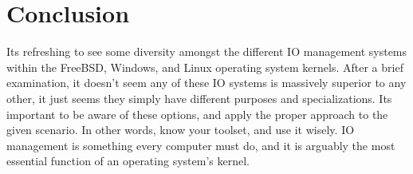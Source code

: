 \documentclass[letterpaper,10pt,draftclsnofoot,onecolumn]{IEEEtran}
\begin{document}
\section{Conclusion}
\noindent Its refreshing to see some diversity amongst the different IO management systems within the FreeBSD, Windows, and Linux operating system kernels. After a brief examination, it doesn’t seem any of these IO systems is massively superior to any other, it just seems they simply have different purposes and specializations. Its important to be aware of these options, and apply the proper approach to the given scenario. In other words, know your toolset, and use it wisely. IO management is something every computer must do, and it is arguably the most essential function of an operating system’s kernel.

\newpage


\end{document}

